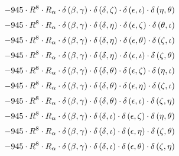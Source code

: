 \begin{subequations}
\begin{gather}
 \\[0.2em] \notag 		 - 945 \cdot R^{8} \cdot R_{\alpha{}} \cdot \delta{}\left(\beta{}, \gamma{}\right) \cdot \delta{}\left(\delta{}, \zeta{}\right) \cdot \delta{}\left(\epsilon{}, \iota{}\right) \cdot \delta{}\left(\eta{}, \theta{}\right) 
 \\[0.2em] \notag 		 - 945 \cdot R^{8} \cdot R_{\alpha{}} \cdot \delta{}\left(\beta{}, \gamma{}\right) \cdot \delta{}\left(\delta{}, \eta{}\right) \cdot \delta{}\left(\epsilon{}, \zeta{}\right) \cdot \delta{}\left(\theta{}, \iota{}\right) 
 \\[0.2em] \notag 		 - 945 \cdot R^{8} \cdot R_{\alpha{}} \cdot \delta{}\left(\beta{}, \gamma{}\right) \cdot \delta{}\left(\delta{}, \eta{}\right) \cdot \delta{}\left(\epsilon{}, \theta{}\right) \cdot \delta{}\left(\zeta{}, \iota{}\right) 
 \\[0.2em] \notag 		 - 945 \cdot R^{8} \cdot R_{\alpha{}} \cdot \delta{}\left(\beta{}, \gamma{}\right) \cdot \delta{}\left(\delta{}, \eta{}\right) \cdot \delta{}\left(\epsilon{}, \iota{}\right) \cdot \delta{}\left(\zeta{}, \theta{}\right) 
 \\[0.2em] \notag 		 - 945 \cdot R^{8} \cdot R_{\alpha{}} \cdot \delta{}\left(\beta{}, \gamma{}\right) \cdot \delta{}\left(\delta{}, \theta{}\right) \cdot \delta{}\left(\epsilon{}, \zeta{}\right) \cdot \delta{}\left(\eta{}, \iota{}\right) 
 \\[0.2em] \notag 		 - 945 \cdot R^{8} \cdot R_{\alpha{}} \cdot \delta{}\left(\beta{}, \gamma{}\right) \cdot \delta{}\left(\delta{}, \theta{}\right) \cdot \delta{}\left(\epsilon{}, \eta{}\right) \cdot \delta{}\left(\zeta{}, \iota{}\right) 
 \\[0.2em] \notag 		 - 945 \cdot R^{8} \cdot R_{\alpha{}} \cdot \delta{}\left(\beta{}, \gamma{}\right) \cdot \delta{}\left(\delta{}, \theta{}\right) \cdot \delta{}\left(\epsilon{}, \iota{}\right) \cdot \delta{}\left(\zeta{}, \eta{}\right) 
 \\[0.2em] \notag 		 - 945 \cdot R^{8} \cdot R_{\alpha{}} \cdot \delta{}\left(\beta{}, \gamma{}\right) \cdot \delta{}\left(\delta{}, \iota{}\right) \cdot \delta{}\left(\epsilon{}, \zeta{}\right) \cdot \delta{}\left(\eta{}, \theta{}\right) 
 \\[0.2em] \notag 		 - 945 \cdot R^{8} \cdot R_{\alpha{}} \cdot \delta{}\left(\beta{}, \gamma{}\right) \cdot \delta{}\left(\delta{}, \iota{}\right) \cdot \delta{}\left(\epsilon{}, \eta{}\right) \cdot \delta{}\left(\zeta{}, \theta{}\right) 
 \\[0.2em] \notag 		 - 945 \cdot R^{8} \cdot R_{\alpha{}} \cdot \delta{}\left(\beta{}, \gamma{}\right) \cdot \delta{}\left(\delta{}, \iota{}\right) \cdot \delta{}\left(\epsilon{}, \theta{}\right) \cdot \delta{}\left(\zeta{}, \eta{}\right) 

\end{gather}
\end{subequations}
